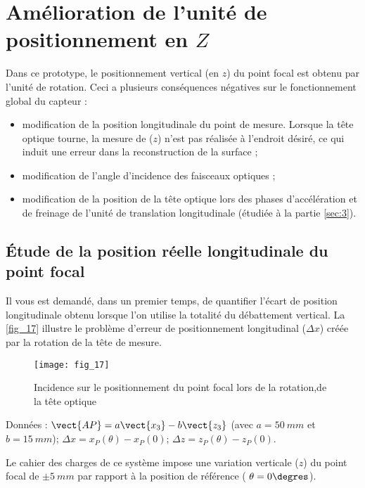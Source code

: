 \section{Amélioration de l’unité de positionnement en $Z$}
\ifprof
\else
Dans ce prototype, le positionnement vertical (en $z$) du point focal est obtenu par l’unité de rotation. Ceci a
plusieurs conséquences négatives sur le fonctionnement global du capteur :
\begin{itemize}
\item modification de la position longitudinale du point de mesure. Lorsque la tête optique tourne, la
mesure de ($z$) n’est pas réalisée à l’endroit désiré, ce qui induit une erreur dans la reconstruction de
la surface ;
\item modification de l’angle d’incidence des faisceaux optiques ;
\item modification de la position de la tête optique lors des phases d’accélération et de freinage de l’unité
de translation longitudinale (étudiée à la partie \ref{sec:3}).
\end{itemize}
\fi


\subsection{Étude de la position réelle longitudinale du point focal}
\ifprof
\else
Il vous est demandé, dans un premier temps, de quantifier l’écart de position
longitudinale obtenu lorsque l’on utilise la totalité du débattement vertical.
La \autoref{fig_17} illustre le problème d’erreur de positionnement longitudinal ($\Delta x$) créée
par la rotation de la tête de mesure. 
\begin{figure}[H]
\centering
\texttt{[image: fig\_17]}
\caption{\label{fig_17} Incidence sur le positionnement du point focal lors de la rotation,de la tête optique}
\end{figure}

Données : 
$ \vect{AP} = a\vect{x_3}-b\vect{z_3}$ (avec $a = \SI{50}{mm}$ et $b =\SI{15}{mm}$);
$\Delta x = x_P(\theta)-x_P(0)$; $\Delta z = z_P(\theta) - z_P(0)$.

Le cahier des charges de ce système impose une variation verticale ($z$) du point
focal de $\pm \SI{5}{mm}$ par rapport à la position de référence ( $\theta = 0\degres$).

\fi

